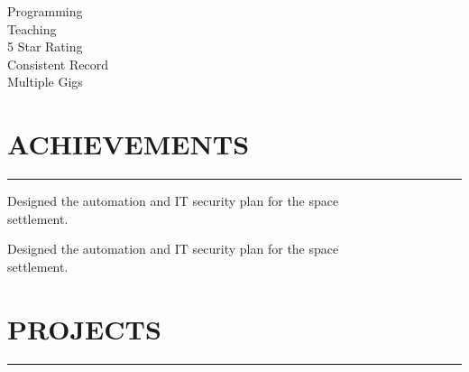 \documentclass[]{resume}
\begin{document}
\begin{minipage}[t]{0.66\textwidth}
    \vspace{8pt}
     
    \noindent

    \vspace{-5pt}
    \hspace{5 em}
    \begin{minipage}{0.85\textwidth\vspace{2pt}}
        Programming\\
        Teaching\\
        5 Star Rating\\
        Consistent Record\\
        Multiple Gigs
    \end{minipage}



    \section{ACHIEVEMENTS}
    \noindent\rule{12.5 cm}{0.4pt}

     
    \vspace{4pt}
    \begin{minipage}{0.85\textwidth\vspace{4pt}}
        Designed the automation and IT security plan for the space\\settlement.
    \end{minipage}

    \vspace{8pt}
     
    \vspace{4pt}
    \begin{minipage}{0.85\textwidth\vspace{4pt}}
        Designed the automation and IT security plan for the space\\settlement.
    \end{minipage}



    \section{PROJECTS}
    \noindent\rule{12.5 cm}{0.4pt}


\end{minipage}
\end{document}
